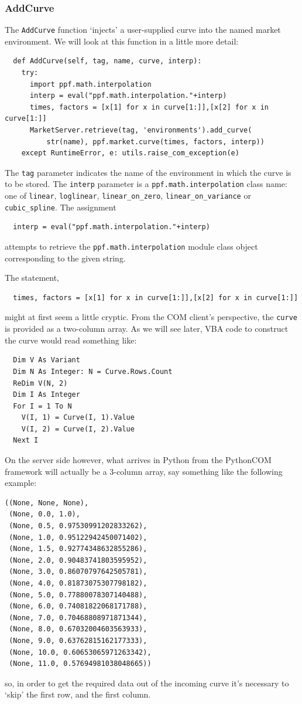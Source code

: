 \subsubsection{AddCurve}\label{subsec:AddCurve}
The \verb|AddCurve| function `injects' a user-supplied curve into the
named market environment. We will look at this function in a little
more detail:
\begin{verbatim}
  def AddCurve(self, tag, name, curve, interp):
    try:
      import ppf.math.interpolation
      interp = eval("ppf.math.interpolation."+interp)
      times, factors = [x[1] for x in curve[1:]],[x[2] for x in curve[1:]]
      MarketServer.retrieve(tag, 'environments').add_curve(
          str(name), ppf.market.curve(times, factors, interp))
    except RuntimeError, e: utils.raise_com_exception(e)
\end{verbatim}
The \verb|tag| parameter indicates the name of the environment in
which the curve is to be stored. The \verb|interp| parameter is a
\verb|ppf.math.interpolation| class name: one of \verb|linear|,
\verb|loglinear|, \verb|linear_on_zero|, \verb|linear_on_variance| or
\verb|cubic_spline|. The assignment
\begin{verbatim}
  interp = eval("ppf.math.interpolation."+interp)
\end{verbatim} attempts to retrieve the \verb|ppf.math.interpolation|
module class object corresponding to the given string. 

The statement,
\begin{verbatim}
  times, factors = [x[1] for x in curve[1:]],[x[2] for x in curve[1:]]
\end{verbatim} might at first seem a little cryptic. From the COM client's
perspective, the \verb|curve| is provided as a two-column array. As we
will see later, VBA code to construct the curve would read something like:
\begin{verbatim}
  Dim V As Variant
  Dim N As Integer: N = Curve.Rows.Count
  ReDim V(N, 2)
  Dim I As Integer
  For I = 1 To N
    V(I, 1) = Curve(I, 1).Value
    V(I, 2) = Curve(I, 2).Value
  Next I
\end{verbatim}
On the server side however, what arrives in Python from the PythonCOM
framework will actually be a 3-column array, say something like the
following example:
\begin{verbatim}
((None, None, None),
 (None, 0.0, 1.0),
 (None, 0.5, 0.97530991202833262),
 (None, 1.0, 0.95122942450071402),
 (None, 1.5, 0.92774348632855286),
 (None, 2.0, 0.90483741803595952),
 (None, 3.0, 0.86070797642505781),
 (None, 4.0, 0.81873075307798182),
 (None, 5.0, 0.77880078307140488),
 (None, 6.0, 0.74081822068171788),
 (None, 7.0, 0.70468808971871344),
 (None, 8.0, 0.67032004603563933),
 (None, 9.0, 0.63762815162177333),
 (None, 10.0, 0.60653065971263342),
 (None, 11.0, 0.57694981038048665))
\end{verbatim} so, in order to get the required data out of the
incoming curve it's necessary to `skip' the first row, and the first
column. 

